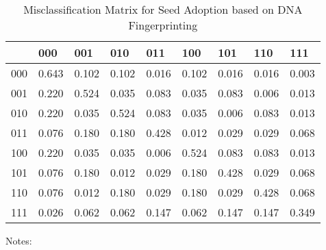 \begin{table}
\caption{Misclassification Matrix for Seed Adoption based on DNA Fingerprinting}
\label{tab:cm}
\begin{tabular}{lllllllll}
\toprule
 & 000 & 001 & 010 & 011 & 100 & 101 & 110 & 111 \\
\midrule
000 & 0.643 & 0.102 & 0.102 & 0.016 & 0.102 & 0.016 & 0.016 & 0.003 \\
001 & 0.220 & 0.524 & 0.035 & 0.083 & 0.035 & 0.083 & 0.006 & 0.013 \\
010 & 0.220 & 0.035 & 0.524 & 0.083 & 0.035 & 0.006 & 0.083 & 0.013 \\
011 & 0.076 & 0.180 & 0.180 & 0.428 & 0.012 & 0.029 & 0.029 & 0.068 \\
100 & 0.220 & 0.035 & 0.035 & 0.006 & 0.524 & 0.083 & 0.083 & 0.013 \\
101 & 0.076 & 0.180 & 0.012 & 0.029 & 0.180 & 0.428 & 0.029 & 0.068 \\
110 & 0.076 & 0.012 & 0.180 & 0.029 & 0.180 & 0.029 & 0.428 & 0.068 \\
111 & 0.026 & 0.062 & 0.062 & 0.147 & 0.062 & 0.147 & 0.147 & 0.349 \\
\bottomrule
\end{tabular}
\begin{tablenotes}
    \item \footnotesize Notes:
\end{tablenotes}
\end{table}
